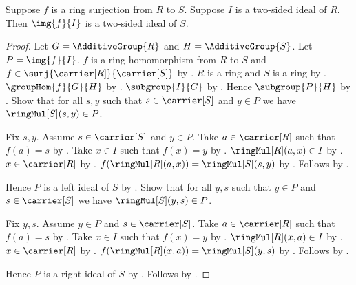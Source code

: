 \begin{theorem}\label{ring_surjection_two_sided_ideal_image}
    Suppose $f$ is a ring surjection from $R$ to $S$.
    Suppose $I$ is a two-sided ideal of $R$.
    Then $\img{f}{I}$ is a two-sided ideal of $S$.
\end{theorem}
\begin{proof}
    Let $G=\AdditiveGroup{R}$ and $H=\AdditiveGroup{S}$.
    Let $P=\img{f}{I}$.
    $f$ is a ring homomorphism from $R$ to $S$ and
        $f\in\surj{\carrier[R]}{\carrier[S]}$ by
        .
    $R$ is a ring and $S$ is a ring by
        .
    $\groupHom{f}{G}{H}$ by
        .
    $\subgroup{I}{G}$ by
        .
    Hence $\subgroup{P}{H}$ by
        .
    Show that for all $s,y$ such that $s\in\carrier[S]$ and
        $y\in P$ we have $\ringMul[S](s,y)\in P$.
    \begin{subproof}
        Fix $s,y$.
        Assume $s\in\carrier[S]$ and $y\in P$.
        Take $a\in\carrier[R]$ such that $f(a)=s$ by .
        Take $x\in I$ such that $f(x)=y$ by
            .
        $\ringMul[R](a,x)\in I$ by
            .
        $x\in\carrier[R]$ by
            .
        $f(\ringMul[R](a,x))=\ringMul[S](s,y)$ by
            .
        Follows by
            .
    \end{subproof}
    Hence $P$ is a left ideal of $S$ by
        .
    Show that for all $y,s$ such that $y\in P$ and
        $s\in\carrier[S]$ we have $\ringMul[S](y,s)\in P$.
    \begin{subproof}
        Fix $y,s$.
        Assume $y\in P$ and $s\in\carrier[S]$.
        Take $a\in\carrier[R]$ such that $f(a)=s$ by .
        Take $x\in I$ such that $f(x)=y$ by
            .
        $\ringMul[R](x,a)\in I$ by
            .
        $x\in\carrier[R]$ by
            .
        $f(\ringMul[R](x,a))=\ringMul[S](y,s)$ by
            .
        Follows by
            .
    \end{subproof}
    Hence $P$ is a right ideal of $S$ by
        .
    Follows by .
\end{proof}

